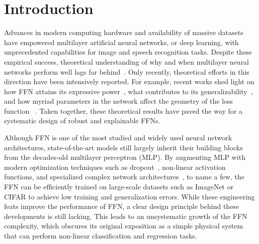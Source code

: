 \documentclass[5p]{elsarticle}
\begin{document}
\linenumbers

\section{Introduction}

Advances in modern computing hardware and availability of massive datasets have empowered multilayer artificial neural networks, or deep learning, with unprecedented capabilities for image and speech recognition tasks. Despite these empirical success, theoretical understanding of why and when multilayer neural networks perform well lags far behind~\cite{mezard1}.
Only recently, theoretical efforts in this direction have been intensively reported. For example, recent works shed light on how FFN attains its expressive power~\cite{Poggio2017, LinTegmark2017, Raghu2017, Poole2016}, what contributes to its generalizability~\cite{Zhang2017,Dinh2017}, and how myriad parameters in the network affect the geometry of the loss function ~\cite{dauphin, ch, penn1, penn2}. Taken together, these theoretical results have paved the way for a systematic design of robust and explainable FFNs.

Although FFN is one of the most studied and widely used neural network architectures, state-of-the-art models still largely inherit their building blocks from the decades-old multilayer perceptron (MLP). By augmenting MLP with modern optimization techniques such as dropout~\cite{srivastava2014}, non-linear activation functions, and specialized complex network architectures~\cite{Krizhevsky}, to name a few, the FFN can be efficiently trained on large-scale datasets such as ImageNet or CIFAR to achieve low training and generalization errors.
While these engineering feats improve the performance of FFN, a clear design principle behind these developments is still lacking. This leads to an unsystematic growth of the FFN complexity, which obscures its original exposition as a simple physical system that can perform non-linear classification and regression tasks.
\end{document}
